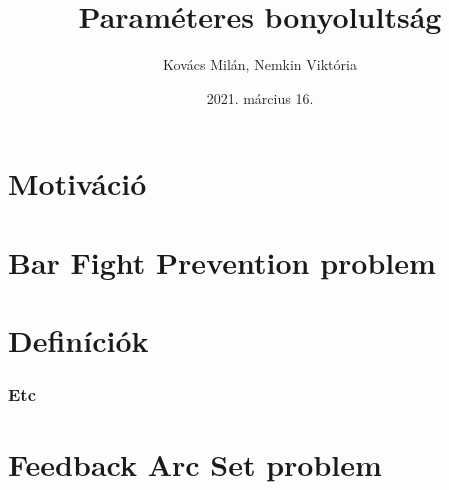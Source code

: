 \documentclass[aspectratio=169]{beamer}
\begin{document}
\title{Paraméteres bonyolultság}
\author{Kovács Milán, Nemkin Viktória}
\date{2021. március 16.}


\frame{\titlepage}


\section{Motiváció}






\section{Bar Fight Prevention problem}









\section{Definíciók}
\begin{frame}
\frametitle{Etc}
\end{frame}

\section{Feedback Arc Set problem}





\end{document}
